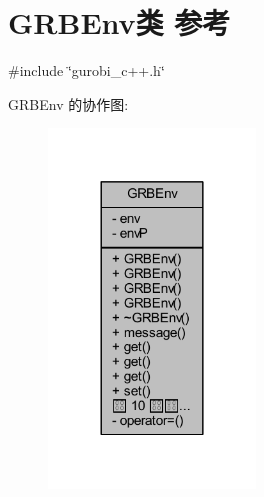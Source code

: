 \hypertarget{classGRBEnv}{}\section{G\+R\+B\+Env类 参考}
\label{classGRBEnv}


{\ttfamily \#include \char`\"{}gurobi\+\_\+c++.\+h\char`\"{}}



G\+R\+B\+Env 的协作图\+:
\nopagebreak
\begin{figure}[H]
\begin{center}
\leavevmode
\includegraphics[width=156pt]{classGRBEnv__coll__graph}
\end{center}
\end{figure}
